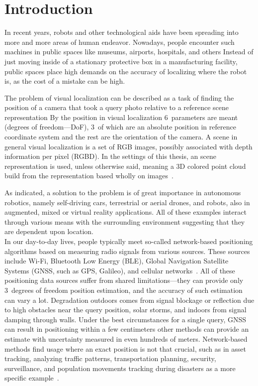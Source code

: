 \chapter*{Introduction} \label{intro}

In recent years, robots and other technological aids have been spreading into more and more
areas of human endeavor. Nowadays, people encounter such machines in public spaces
like museums, airports, hospitals, and others
Instead of just moving inside of a stationary
protective box in a manufacturing facility, public spaces place high demands on
the accuracy of localizing where the robot is, as the cost of a mistake can be high.

The problem of visual localization can be described as a task of finding
the position of a camera that took a query photo relative to a reference scene
representation
By the position in visual localization
6~parameters are meant (degrees of freedom---DoF), 3~of which are an absolute position in
reference coordinate system and the rest are the orientation of the camera.
A scene in general visual localization is a set
of RGB images, possibly associated with depth information per pixel (RGBD).
In the settings of this thesis, an  scene representation
is used, unless otherwise said, meaning a 3D colored point cloud build from the 
representation based wholly on images~\citep{SOTARendering}.

As indicated, a solution to the problem is of great importance in autonomous robotics,
namely self-driving cars, terrestrial or aerial drones, and robots, also in augmented,
mixed or virtual reality applications. All of these examples interact through various
means with the surrounding environment suggesting that they are dependent upon location.\\

In our day-to-day lives, people typically meet so-called network-based positioning algorithms based on measuring
radio signals from various sources. These sources include Wi-Fi, Bluetooth Low Energy (BLE), Global Navigation
Satellite Systems (GNSS, such as GPS, Galileo), and cellular networks~\citep{Trogh2019}. All of these positioning
data sources suffer from shared limitations---they
can provide only 3~degrees of freedom position estimation, and the accuracy of such estimation can vary a lot.
Degradation outdoors comes from signal blockage or reflection due to high obstacles near the query position, 
solar storms, and indoors from signal damping through walls. Under the
best circumstances for a single query, GNSS can result in positioning within a few
centimeters
other methods can provide an estimate with uncertainty measured in even hundreds of meters. Network-based methods
find usage where an exact position is not that crucial, such as in asset tracking,
analyzing traffic patterns, transportation planning, security, surveillance, and population
movements tracking during disasters as a more specific example~\citep{Trogh2019}.

